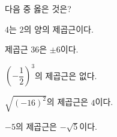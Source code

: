 다음 중 옳은 것은?
\begin{choicesv}{\rule[-3ex]{0pt}{8ex}$4$는 $2$의 양의 제곱근이다.}{\rule[-3ex]{0pt}{8ex}제곱근 $36$은 $\pm 6$이다.}{\rule[-3ex]{0pt}{8ex}$\left(-\dfrac{1}{2}\right)^3$의 제곱근은 없다.}{\rule[-3ex]{0pt}{8ex}$\sqrt{(-16)^2}$의 제곱근은 $4$이다.}{\rule[-3ex]{0pt}{8ex}$-5$의 제곱근은 $-\sqrt{5}$이다.}\end{choicesv}
